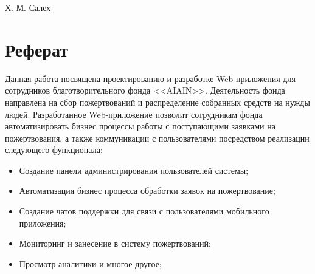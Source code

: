 \documentclass[a4paper,12pt,reqno]{article}
\begin{document}
	

	{Х. М. Салех}

\VKR

\newpage

\clearPage

\section*{Реферат}


Данная работа посвящена проектированию и разработке Web-приложения для сотрудников благотворительного фонда <<AIAIN>>. Деятельность фонда направлена на сбор пожертвований и распределение собранных средств на нужды людей. Разработанное Web-приложение позволит сотрудникам фонда автоматизировать бизнес процессы работы с поступающими заявками на пожертвования, а также коммуникации с пользователями посредством реализации следующего функционала:
\begin{itemize}
    \item Создание панели администрирования пользователей системы;
    \item Автоматизация бизнес процесса обработки заявок на пожертвование;
    \item Создание чатов поддержки для связи с пользователями мобильного приложения;
    \item Мониторинг и занесение в систему пожертвований;
    \item Просмотр аналитики и многое другое;
\end{itemize}
\end{document}
